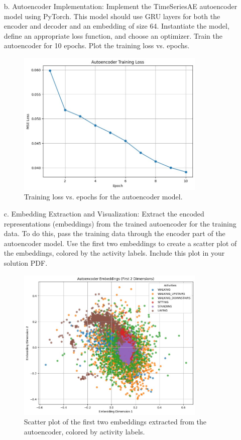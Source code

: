 \documentclass[a3paper,12pt]{extarticle} %
\begin{document}
\begin{enumerate}
\begin{itemize}
\item[b.] Autoencoder Implementation: Implement the TimeSeriesAE autoencoder model using PyTorch. This model should use GRU layers for both the encoder and decoder and an embedding of size 64. Instantiate the model, define an appropriate loss function, and choose an optimizer. Train the autoencoder for 10 epochs. Plot the training loss vs. epochs.
\begin{figure}[H]
    \centering
    \includegraphics[width=0.85\textwidth]{autoencoderloss.jpg}
    \caption{Training loss vs. epochs for the autoencoder model.}
    \label{fig:autoencoder-loss}
\end{figure}

\item[c.] Embedding Extraction and Visualization: Extract the encoded representations (embeddings) from the trained autoencoder for the training data. To do this, pass the training data through the encoder part of the autoencoder model. Use the first two embeddings to create a scatter plot of the embeddings, colored by the activity labels. Include this plot in your solution PDF.
\begin{figure}[H]
    \centering
    \includegraphics[width=0.85\textwidth]{embeddings.jpg}
    \caption{Scatter plot of the first two embeddings extracted from the autoencoder, colored by activity labels.}
    \label{fig:autoencoder-embeddings}
\end{figure}


\end{itemize}
\end{enumerate}
\end{document}
